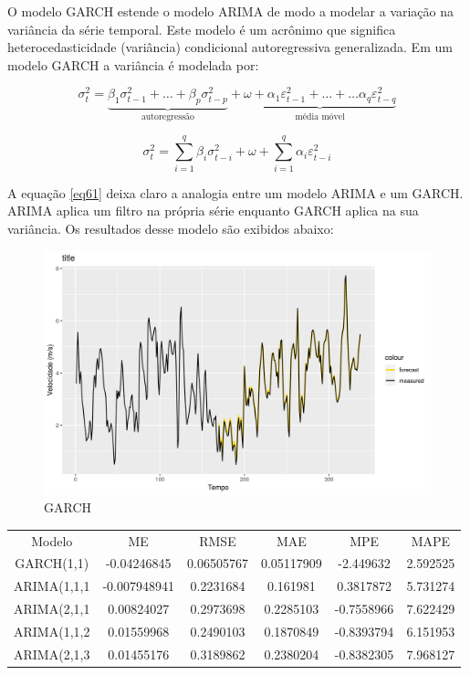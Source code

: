 \documentclass[
	12pt,				%
	openright,			%
	oneside,			%
	a4paper,			%
	english,			%
	french,				%
	spanish,			%
	brazil				%
	]{abntex2}
\begin{document}
O modelo GARCH estende o modelo ARIMA de modo a modelar a variação na variância da série temporal. Este modelo é um acrônimo que significa heterocedasticidade (variância) condicional autoregressiva generalizada. Em um modelo GARCH a variância é modelada por:

\begin{equation}\label{eq61}
\sigma_t^2 = \underbrace{\beta_1\sigma_{t-1}^2 + \dots + \beta_p\sigma_{t-p}^2}_\text{autoregressão}  + \underbrace{\omega + \alpha_1\varepsilon_{t-1}^2 + \dots + \dots \alpha_q\varepsilon_{t-q}^2}_\text{média móvel} 
\end{equation}

\begin{equation}
\sigma_t^2 = \sum\limits_{i=1}^q\beta_i\sigma_{t-i}^2 + \omega + \sum\limits_{i=1}^q\alpha_i\varepsilon_{t-i}^2
\end{equation}

A equação \ref{eq61} deixa claro a analogia entre um modelo ARIMA e um GARCH. ARIMA aplica um filtro na própria série enquanto GARCH aplica na sua variância. Os resultados desse modelo são exibidos abaixo:

\begin{figure}[h]
    \centering
	\includegraphics[width=\textwidth]{garch_first}
	\caption{GARCH}
\end{figure}
\FloatBarrier

\begin{center}
\begin{tabular}{ |c|c|c|c|c|c| } 
\hline
Modelo&ME&RMSE&MAE&MPE&MAPE \\
GARCH(1,1)&-0.04246845&0.06505767&0.05117909&-2.449632&2.592525 \\
\hline
ARIMA(1,1,1&-0.007948941&0.2231684&0.161981&0.3817872&5.731274 \\
\hline
ARIMA(2,1,1&0.00824027&0.2973698&0.2285103&-0.7558966&7.622429 \\
\hline
ARIMA(1,1,2&0.01559968&0.2490103&0.1870849&-0.8393794&6.151953 \\
\hline
ARIMA(2,1,3&0.01455176&0.3189862&0.2380204&-0.8382305&7.968127 \\
\hline
\end{tabular}
\end{center}
\end{document}
